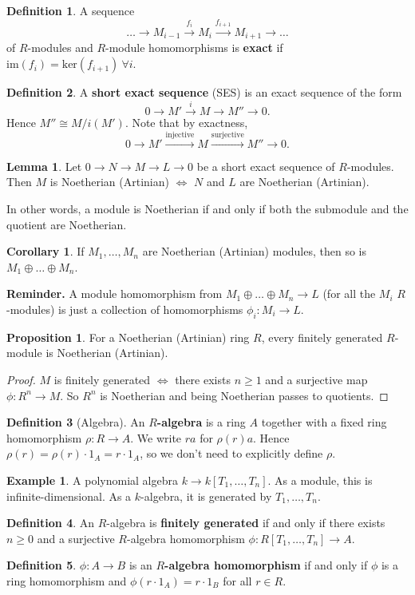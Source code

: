 \documentclass{article}
\theoremstyle{definition}
\newtheorem{lemma}[theorem]{Lemma}
\newtheorem{cor}[theorem]{Corollary}
\newtheorem{prop}[theorem]{Proposition}
\newtheorem{example}{Example}[section]
\newtheorem{defn}{Definition}[section]
\begin{document}
\begin{defn}
    A sequence $$\ldots \to M_{i-1} \stackrel{f_i}{\to}  M_i \stackrel{f_{i+1}}{\to}  M_{i+1} \to \ldots$$
    of $R$-modules and $R$-module homomorphisms is \textbf{exact} if $\text{im}(f_i)= \text{ker}(f_{i+1}) ~\forall i$.
\end{defn}
\begin{defn}
    A \textbf{short exact sequence} (SES) is an exact sequence of the form $$0 \to M' \stackrel{i}{\to}  M \to M'' \to 0.$$
    Hence $M'' \cong M/i(M')$. Note that by exactness, $$0 \to M' \stackrel{\text{injective}}{\to}  M \stackrel{\text{surjective}}{\to}  M'' \to 0.$$
\end{defn}
\begin{lemma}
    Let $0 \to N \to M \to L \to 0$ be a short exact sequence of $R$-modules. Then $M$ is Noetherian (Artinian) $\iff$ $N$ and $L$ are Noetherian (Artinian).
    \vspace{1mm}
     
    In other words, a module is Noetherian if and only if both the submodule and the quotient are Noetherian.
\end{lemma}
\begin{cor}
    If $M_1,\ldots,M_n$ are Noetherian (Artinian) modules, then so is $M_1 \oplus \ldots \oplus M_n$.
\end{cor}
\textbf{Reminder.} A module homomorphism from $M_1 \oplus \ldots \oplus M_n \to L$ (for all the $M_i$ $R$-modules) is just a collection of homomorphisms $\phi_i: M_i \to L$. 
\begin{prop}
    For a Noetherian (Artinian) ring $R$, every finitely generated $R$-module is Noetherian (Artinian).
\end{prop}
\begin{proof}
    $M$ is finitely generated $\iff$ there exists $n\ge 1$ and a surjective map $\phi : R^n \to M$. So $R^n$ is Noetherian and being Noetherian passes to quotients.
\end{proof}


\begin{defn}[Algebra]
    An \textbf{$R$-algebra} is a ring $A$ together with a fixed ring homomorphism $\rho: R \to A$. We write $ra$ for $\rho(r)a$. Hence $\rho(r) = \rho(r) \cdot 1_A = r \cdot 1_A$, so we don't need to explicitly define $\rho$.
\end{defn}
\begin{example}
    A polynomial algebra $k \to k[T_1,\ldots,T_n]$. As a module, this is infinite-dimensional. As a $k$-algebra, it is generated by $T_1,\ldots,T_n$.
\end{example}
\begin{defn}
    An $R$-algebra is \textbf{finitely generated} if and only if there exists $n \ge 0$ and a surjective $R$-algebra homomorphism $\phi: R[T_1,\ldots,T_n] \to A$. 
\end{defn}
\begin{defn}
    $\phi: A \to B$ is an  \textbf{$R$-algebra homomorphism} if and only if $\phi$ is a ring homomorphism and $\phi(r \cdot 1_A) = r \cdot 1_B$ for all $r \in R$.
\end{defn}
\end{document}
